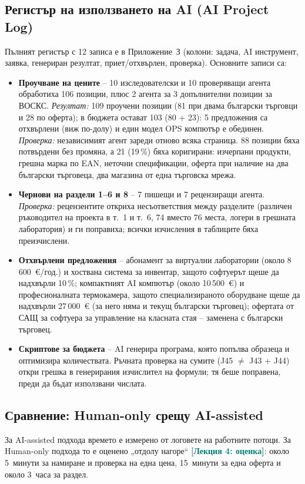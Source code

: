 \documentclass[11pt,a4paper]{article}
\newcommand{\lecturetag}[1]{\textcolor{teal}{\small\bfseries[#1]}}
\newcommand{\NumItems}{103}
\newcommand{\NumBGItems}{80}
\newcommand{\NumOffers}{23}
\begin{document}
\subsection{Регистър на използването на AI (AI Project Log)}
Пълният регистър с 12 записа е в Приложение~З (колони: задача, AI инструмент, заявка, генериран резултат, приет/отхвърлен, проверка). Основните записи са:
\begin{itemize}
  \item \textbf{Проучване на цените} – 10 изследователски и 10 проверяващи агента обработиха 106 позиции, плюс 2 агента за 3 допълнителни позиции за ВОСКС. \emph{Резултат:} 109 проучени позиции (81 при двама български търговци и 28 по оферта); в бюджета остават \NumItems{} (\NumBGItems{} + \NumOffers): 5 предложения са отхвърлени (виж по-долу) и един модел OPS компютър е обединен. \emph{Проверка:} независимият агент зареди отново всяка страница. 88 позиции бяха потвърдени без промяна, а 21 (19\,\%) бяха коригирани: изчерпани продукти, грешна марка по EAN, неточни спецификации, оферта при наличие на два български търговеца, два магазина от една търговска мрежа.
  \item \textbf{Чернови на раздели 1–6 и 8} – 7 пишещи и 7 рецензиращи агента. \emph{Проверка:} рецензентите откриха несъответствия между разделите (различен ръководител на проекта в т.~1 и т.~6, 74 вместо 76 места, логери в грешната лаборатория) и ги поправиха; всички изчисления в таблиците бяха преизчислени.
  \item \textbf{Отхвърлени предложения} – абонамент за виртуални лаборатории (около 8\,600~€/год.) и хоствана система за инвентар, защото софтуерът щеше да надхвърли 10\,\%; компактният AI компютър (около 10\,500~€) и професионалната термокамера, защото специализираното оборудване щеше да надхвърли 27\,000~€ (за него няма и текущ български търговец); офертата от САЩ за софтуера за управление на класната стая – заменена с български търговец.
  \item \textbf{Скриптове за бюджета} – AI генерира програма, която попълва образеца и оптимизира количествата. Ръчната проверка на сумите (J45 $\neq$ J43 + J44) откри грешка в генерирания изчислител на формули; тя беше поправена, преди да бъдат използвани числата.
\end{itemize}

\subsection{Сравнение: Human-only срещу AI-assisted}
За AI-assisted подхода времето е измерено от логовете на работните потоци. За Human-only подхода то е оценено „отдолу нагоре“ \lecturetag{Лекция 4: оценка}: около 5~минути за намиране и проверка на една цена, 15~минути за една оферта и около 3~часа за раздел.
\end{document}
